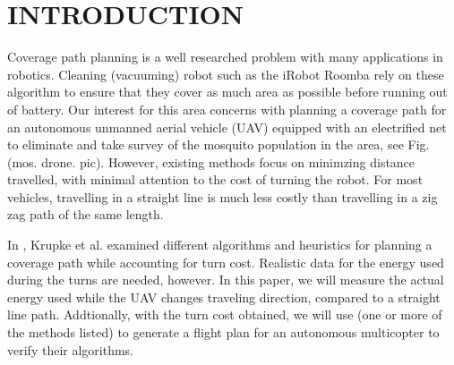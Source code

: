 \section{INTRODUCTION}

Coverage path planning is a well researched problem with many applications in robotics.
Cleaning (vacuuming) robot such as the iRobot Roomba rely on these algorithm to ensure that they cover as much area as possible before running out of battery.
Our interest for this area concerns with planning a coverage path for an autonomous unmanned aerial vehicle (UAV) equipped with an electrified net to eliminate and take survey of the mosquito population in the area, see Fig. (mos. drone. pic).
However, existing methods focus on minimzing distance travelled, with minimal attention to the cost of turning the robot.
For most vehicles, travelling in a straight line is much less costly than travelling in a zig zag path of the same length.

In \cite{krupkethesis}, Krupke et al. examined different algorithms and heuristics for planning a coverage path while accounting for turn cost.
Realistic data for the energy used during the turns are needed, however. 
In this paper, we will measure the actual energy used while the UAV changes traveling direction, compared to a straight line path.
Addtionally, with the turn cost obtained, we will use (one or more of the methods listed) to generate a flight plan for an autonomous multicopter to verify their algorithms.
